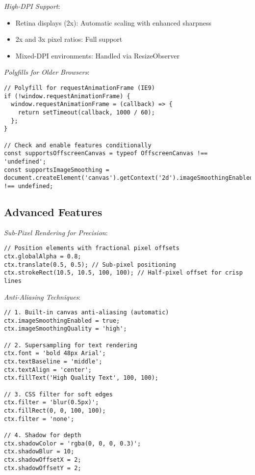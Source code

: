 \documentclass[11pt]{article}
\begin{document}
\emph{High-DPI Support}:

\begin{itemize}
\item Retina displays (2x): Automatic scaling with enhanced sharpness
\item 2x and 3x pixel ratios: Full support
\item Mixed-DPI environments: Handled via ResizeObserver
\end{itemize}

\emph{Polyfills for Older Browsers}:

\begin{verbatim}
// Polyfill for requestAnimationFrame (IE9)
if (!window.requestAnimationFrame) {
  window.requestAnimationFrame = (callback) => {
    return setTimeout(callback, 1000 / 60);
  };
}

// Check and enable features conditionally
const supportsOffscreenCanvas = typeof OffscreenCanvas !== 'undefined';
const supportsImageSmoothing = document.createElement('canvas').getContext('2d').imageSmoothingEnabled !== undefined;
\end{verbatim}
\subsection{Advanced Features}
\label{sec:org6efa7a1}

\emph{Sub-Pixel Rendering for Precision}:

\begin{verbatim}
// Position elements with fractional pixel offsets
ctx.globalAlpha = 0.8;
ctx.translate(0.5, 0.5); // Sub-pixel positioning
ctx.strokeRect(10.5, 10.5, 100, 100); // Half-pixel offset for crisp lines
\end{verbatim}

\emph{Anti-Aliasing Techniques}:

\begin{verbatim}
// 1. Built-in canvas anti-aliasing (automatic)
ctx.imageSmoothingEnabled = true;
ctx.imageSmoothingQuality = 'high';

// 2. Supersampling for text rendering
ctx.font = 'bold 48px Arial';
ctx.textBaseline = 'middle';
ctx.textAlign = 'center';
ctx.fillText('High Quality Text', 100, 100);

// 3. CSS filter for soft edges
ctx.filter = 'blur(0.5px)';
ctx.fillRect(0, 0, 100, 100);
ctx.filter = 'none';

// 4. Shadow for depth
ctx.shadowColor = 'rgba(0, 0, 0, 0.3)';
ctx.shadowBlur = 10;
ctx.shadowOffsetX = 2;
ctx.shadowOffsetY = 2;
\end{verbatim}
\end{document}
